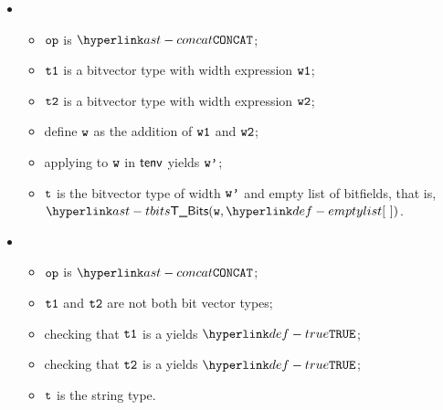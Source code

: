 \begin{itemize}
  \item {}
  \begin{itemize}
    \item $\texttt{op}$ is $\CONCAT$;
    \item $\texttt{t1}$ is a bitvector type with width expression $\texttt{w1}$;
    \item $\texttt{t2}$ is a bitvector type with width expression $\texttt{w2}$;
    \item define $\texttt{w}$ as the addition of $\texttt{w1}$ and $\texttt{w2}$;
    \item applying \normalize{} to $\texttt{w}$ in $\textsf{tenv}$ yields $\texttt{w'}$;
    \item $\texttt{t}$ is the bitvector type of width $\texttt{w'}$ and empty list of bitfields, that is, \\ $\TBits(\vw, \emptylist)$.
  \end{itemize}

  \item {}
  \begin{itemize}
    \item $\texttt{op}$ is $\CONCAT$;
    \item $\texttt{t1}$ and $\texttt{t2}$ are not both bit vector types;
    \item checking that $\texttt{t1}$ is a \Prosesingulartype{} yields $\True$\ProseOrTypeError;
    \item checking that $\texttt{t2}$ is a \Prosesingulartype{} yields $\True$\ProseOrTypeError;
    \item $\texttt{t}$ is the string type.
  \end{itemize}


\end{itemize}
